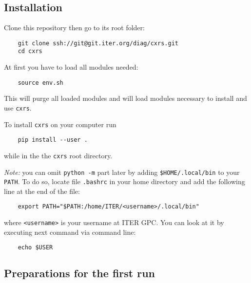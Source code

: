 \documentclass[../main.tex]{subfiles}
\begin{document}
\subsection{Installation}

Clone this repository then go to its root folder:

\begin{verbatim}
    git clone ssh://git@git.iter.org/diag/cxrs.git
    cd cxrs
\end{verbatim}

At first you have to load all modules needed:

\begin{verbatim}
    source env.sh
\end{verbatim}

This will purge all loaded modules and will load modules necessary to install and use \texttt{cxrs}.

To install \texttt{cxrs} on your computer run

\begin{verbatim}
    pip install --user .
\end{verbatim}

while in the the \texttt{cxrs} root directory.

\emph{Note:} you can omit \texttt{python -m} part later by adding \texttt{\$HOME/.local/bin} to your \texttt{PATH}. To do so, locate file \texttt{.bashrc} in your home directory and add the following line at the end of the file:

\begin{verbatim}
    export PATH="$PATH:/home/ITER/<username>/.local/bin"
\end{verbatim}

where \texttt{<username>} is your username at ITER GPC. You can look at it by executing next command via command line:

\begin{verbatim}
    echo $USER
\end{verbatim}

\subsection{Preparations for the first run}
\end{document}
